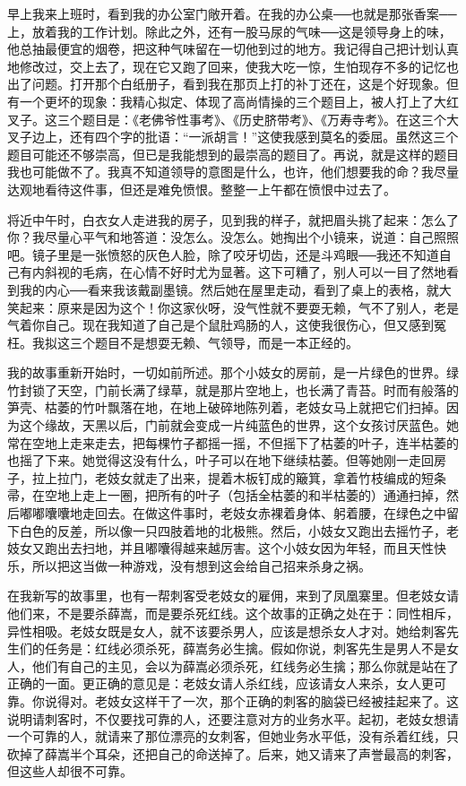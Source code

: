 早上我来上班时，看到我的办公室门敞开着。在我的办公桌──也就是那张香案──上，放着我的工作计划。除此之外，还有一股马尿的气味──这是领导身上的味，他总抽最便宜的烟卷，把这种气味留在一切他到过的地方。我记得自己把计划认真地修改过，交上去了，现在它又跑了回来，使我大吃一惊，生怕现存不多的记忆也出了问题。打开那个白纸册子，看到我在那页上打的补丁还在，这是个好现象。但有一个更坏的现象：我精心拟定、体现了高尚情操的三个题目上，被人打上了大红叉子。这三个题目是：《老佛爷性事考》、《历史脐带考》、《万寿寺考》。在这三个大叉子边上，还有四个字的批语：“一派胡言！”这使我感到莫名的委屈。虽然这三个题目可能还不够崇高，但已是我能想到的最崇高的题目了。再说，就是这样的题目我也可能做不了。我真不知道领导的意图是什么，也许，他们想要我的命？我尽量达观地看待这件事，但还是难免愤恨。整整一上午都在愤恨中过去了。 

将近中午时，白衣女人走进我的房子，见到我的样子，就把眉头挑了起来：怎么了你？我尽量心平气和地答道：没怎么。没怎么。她掏出个小镜来，说道：自己照照吧。镜子里是一张愤怒的灰色人脸，除了咬牙切齿，还是斗鸡眼──我还不知道自己有内斜视的毛病，在心情不好时尤为显著。这下可糟了，别人可以一目了然地看到我的内心──看来我该戴副墨镜。然后她在屋里走动，看到了桌上的表格，就大笑起来：原来是因为这个！你这家伙呀，没气性就不要耍无赖，气不了别人，老是气着你自己。现在我知道了自己是个鼠肚鸡肠的人，这使我很伤心，但又感到冤枉。我拟这三个题目不是想耍无赖、气领导，而是一本正经的。 

我的故事重新开始时，一切如前所述。那个小妓女的房前，是一片绿色的世界。绿竹封锁了天空，门前长满了绿草，就是那片空地上，也长满了青苔。时而有般落的笋壳、枯萎的竹叶飘落在地，在地上破碎地陈列着，老妓女马上就把它们扫掉。因为这个缘故，天黑以后，门前就会变成一片纯蓝色的世界，这个女孩讨厌蓝色。她常在空地上走来走去，把每棵竹子都摇一摇，不但摇下了枯萎的叶子，连半枯萎的也摇了下来。她觉得这没有什么，叶子可以在地下继续枯萎。但等她刚一走回房子，拉上拉门，老妓女就走了出来，提着木板钉成的簸箕，拿着竹枝编成的短条帚，在空地上走上一圈，把所有的叶子（包括全枯萎的和半枯萎的）通通扫掉，然后嘟嘟囔囔地走回去。在做这件事时，老妓女赤裸着身体、躬着腰，在绿色之中留下白色的反差，所以像一只四肢着地的北极熊。然后，小妓女又跑出去摇竹子，老妓女又跑出去扫地，并且嘟囔得越来越厉害。这个小妓女因为年轻，而且天性快乐，所以把这当做一种游戏，没有想到这会给自己招来杀身之祸。 

在我新写的故事里，也有一帮刺客受老妓女的雇佣，来到了凤凰寨里。但老妓女请他们来，不是要杀薛嵩，而是要杀死红线。这个故事的正确之处在于：同性相斥，异性相吸。老妓女既是女人，就不该要杀男人，应该是想杀女人才对。她给刺客先生们的任务是：红线必须杀死，薛嵩务必生擒。假如你说，刺客先生是男人不是女人，他们有自己的主见，会以为薛嵩必须杀死，红线务必生擒；那么你就是站在了正确的一面。更正确的意见是：老妓女请人杀红线，应该请女人来杀，女人更可靠。你说得对。老妓女这样干了一次，那个正确的刺客的脑袋已经被挂起来了。这说明请刺客时，不仅要找可靠的人，还要注意对方的业务水平。起初，老妓女想请一个可靠的人，就请来了那位漂亮的女刺客，但她业务水平低，没有杀着红线，只砍掉了薛嵩半个耳朵，还把自己的命送掉了。后来，她又请来了声誉最高的刺客，但这些人却很不可靠。 

